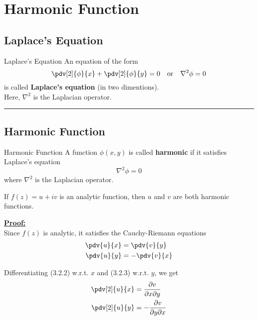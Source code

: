 
\section{Harmonic Function}

\subsection{Laplace's Equation}
\begin{definition}{Laplace's Equation}{}
    An equation of the form
    \begin{equation}
        \pdv[2]{\phi}{x} + \pdv[2]{\phi}{y} = 0
        \quad \text{or} \quad
        \nabla^2 \phi = 0
    \end{equation}
    is called \textbf{Laplace's equation} (in two dimentions). \\
    Here, $\nabla^2$ is the Laplacian operator.
\end{definition}

\vspace{20pt}\rule{3in}{1pt}

\subsection{Harmonic Function}
\begin{definition}{Harmonic Function}{}
    A function $\phi(x,y)$ is called \textbf{harmonic} if it satisfies Laplace's equation
    \begin{equation}
        \nabla^2 \phi = 0
    \end{equation}
    where $\nabla^2$ is the Laplacian operator.
\end{definition}

\begin{theorem}{}{}
    If $f(z) = u + iv$ is an analytic function, then $u$ and $v$ are both harmonic functions.
\end{theorem}

\underline{\textbf{Proof:}} \\
Since $f(z)$ is analytic, it satisfies the Cauchy-Riemann equations
\begin{align}
    \pdv{u}{x} &= \pdv{v}{y} \\
    \pdv{u}{y} &= -\pdv{v}{x}
\end{align}

Differentiating (3.2.2) w.r.t. $x$ and (3.2.3) w.r.t. $y$, we get
\begin{align}
    \pdv[2]{u}{x} &= \frac{\partial v}{\partial x \partial y} \\
    \pdv[2]{u}{y} &= -\frac{\partial v}{\partial y \partial x}
\end{align}

